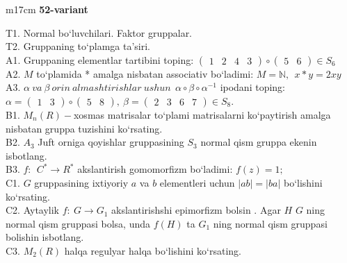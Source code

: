 \documentclass{article}
\begin{document}
\begin{tabular}{m{17cm}}
\end{tabular}
\vspace{1cm}


\begin{tabular}{m{17cm}}
\textbf{52-variant}
\newline

T1. Normal bo`luvchilari. Faktor gruppalar. \\
T2. Gruppaning to`plamga ta'siri. \\
A1. Gruppaning elementlar tartibini toping: \(\begin{pmatrix}
1 & 2 & 4 & 3
\end{pmatrix} \circ \begin{pmatrix}
5 & 6
\end{pmatrix} \in S_{6}\) \\
A2. \(M\) to`plamida * amalga nisbatan associativ bo`ladimi: \(M\mathbb{= N},\ \ x*y = 2xy\) \\
A3. \(\alpha\ va\ \beta\ orin\ almashtirishlar\ ushun\ \ \alpha \circ \beta \circ \alpha^{- 1}\) ipodani toping:\(\alpha = \begin{pmatrix}
1 & 3
\end{pmatrix} \circ \begin{pmatrix}
5 & 8
\end{pmatrix},\ \beta = \begin{pmatrix}
2 & 3 & 6 & 7
\end{pmatrix} \in S_{8}\). \\
B1. \(M_{n}(R) -\)xosmas matrisalar to`plami matrisalarni ko`paytirish amalga nisbatan gruppa tuzishini ko`rsating. \\
B2. \(A_{3}\) Juft orniga qoyishlar gruppasining \(S_{3}\) normal qism gruppa ekenin isbotlang. \\
B3. \(f:\ \ C^{*} \rightarrow R^{*}\) akslantirish gomomorfizm bo`ladimi: \(f(z) = 1;\) \\
C1. \(G\) gruppasining ixtiyoriy \(a\) va \(b\) elementleri uchun \(|ab| = |ba|\) bo`lishini ko`rsating. \\
C2. Aytaylik \(f:\ G \rightarrow G_{1}\) akslantirishshi epimorfizm bo\textquotesingle lsin . Agar \(H\) \(G\) ning normal qism gruppasi bolsa, unda \(f(H)\) ta \(G_{1}\) ning normal qism gruppasi bolishin isbotlang. \\
C3. \(M_{2}(R)\) halqa regulyar halqa bo`lishini ko`rsating. \\

\end{tabular}
\vspace{1cm}
\end{document}
